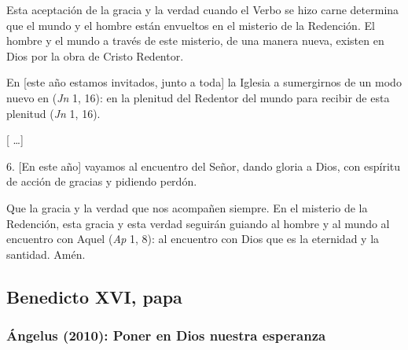 \begin{body}
	Esta aceptación de la gracia y la verdad cuando el Verbo se hizo carne determina que el mundo y el hombre están envueltos en el misterio de la Redención. El hombre y el mundo a través de este misterio, de una manera nueva, existen en Dios por la obra de Cristo Redentor.
	
	En {[}este año estamos invitados, junto a toda{]} la Iglesia a sumergirnos de un modo nuevo en  (\emph{Jn} 1, 16): en la plenitud del Redentor del mundo para recibir de esta plenitud  (\emph{Jn} 1, 16).
	
	{[} \ldots{}{]}
	
	6. {[}En este año{]} vayamos al encuentro del Señor, dando gloria a Dios, con espíritu de acción de gracias y pidiendo perdón.
	
	Que la gracia y la verdad que  nos acompañen siempre. En el misterio de la Redención, esta gracia y esta verdad seguirán guiando al hombre y al mundo al encuentro con Aquel  (\emph{Ap} 1, 8): al encuentro con Dios que es la eternidad y la santidad. Amén.
\end{body}

\newsection

\subsection{Benedicto XVI, papa}

\subsubsection{Ángelus (2010): Poner en Dios nuestra esperanza}


